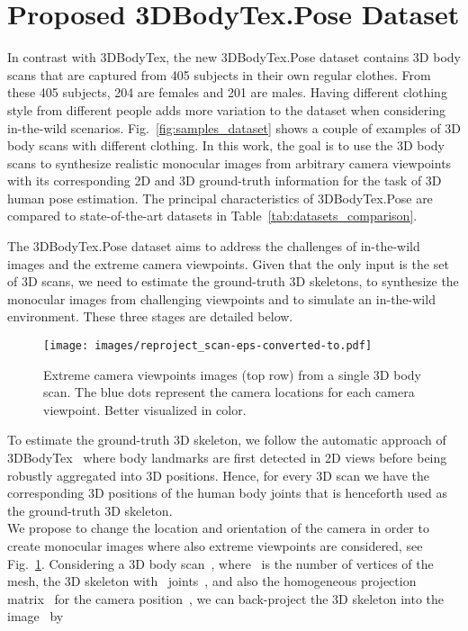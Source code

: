 \documentclass{article}
\begin{document}
\vspace{-0.1cm}
\section{Proposed 3DBodyTex.Pose Dataset}
\label{sec:proposeddataet}
\vspace{-0.1cm}
In contrast with 3DBodyTex, the new 3DBodyTex.Pose dataset contains 3D body scans that are captured from 405 subjects in their own regular clothes. From these 405 subjects, 204 are females and 201 are males. Having different clothing style from different people adds more variation to the dataset when considering in-the-wild scenarios. Fig.~\ref{fig:samples_dataset} shows a couple of examples of 3D body scans with different clothing. In this work, the goal is to use the 3D body scans to synthesize realistic monocular images from arbitrary camera viewpoints with its corresponding 2D and 3D ground-truth information for the task of 3D human pose estimation. The principal characteristics of 3DBodyTex.Pose are compared to state-of-the-art datasets in Table~\ref{tab:datasets_comparison}.

The 3DBodyTex.Pose dataset aims to address the challenges of in-the-wild images and the extreme camera viewpoints. Given that the only input is the set of 3D scans, we need to estimate the ground-truth 3D skeletons, to synthesize the monocular images from challenging viewpoints and to simulate an in-the-wild environment. These three stages are detailed below.
\begin{figure}[t]
    \vspace{-0.2cm}
    \centering
    \texttt{[image: images/reproject\_scan-eps-converted-to.pdf]}
    \caption{Extreme camera viewpoints images (top row) from a single 3D body scan. The blue dots represent the camera locations for each camera viewpoint. Better visualized in color.}
    \label{fig:camera_extreme_viewpoints}
    \vspace{-0.2cm}
\end{figure}

 To estimate the ground-truth 3D skeleton, we follow the automatic approach of 3DBodyTex~\cite{Saint20183DBodyTexT3} where body landmarks are first detected in 2D views before being robustly aggregated into 3D positions. Hence, for every 3D scan we have the corresponding 3D positions of the human body joints that is henceforth used as the ground-truth 3D skeleton.\\ 
 We propose to change the location and orientation of the camera in order to create monocular images where also extreme viewpoints are considered, see Fig.~\ref{fig:camera_extreme_viewpoints}. Considering a 3D body scan~, where~ is the number of vertices of the mesh, the 3D skeleton with~ joints~, and also the homogeneous projection matrix~ for the camera position~, we can back-project the 3D skeleton into the image~ by
\end{document}
